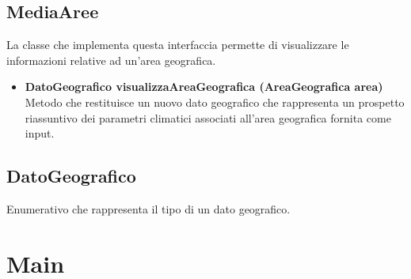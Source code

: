 \documentclass[a4paper, 12pt]{report}
\begin{document}
			\subsection{MediaAree}
			La classe che implementa questa interfaccia permette di visualizzare le informazioni relative ad un'area geografica.
			\begin{itemize}
				\item\textbf {DatoGeografico visualizzaAreaGeografica (AreaGeografica area)} Metodo che restituisce un nuovo dato geografico che rappresenta un prospetto riassuntivo dei parametri climatici associati all'area geografica fornita come input.
			\end{itemize}
			\subsection{DatoGeografico}
			Enumerativo che rappresenta il tipo di un dato geografico.


		\section{Main}

	
\end{document}
